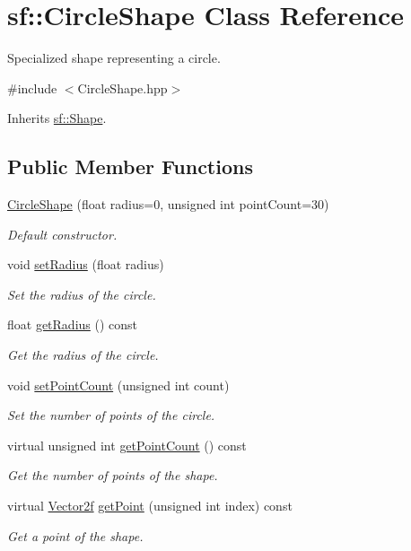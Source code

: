 \hypertarget{classsf_1_1_circle_shape}{\section{sf\+:\+:Circle\+Shape Class Reference}
\label{classsf_1_1_circle_shape}
}


Specialized shape representing a circle.  




{\ttfamily \#include $<$Circle\+Shape.\+hpp$>$}



Inherits \hyperlink{classsf_1_1_shape}{sf\+::\+Shape}.

\subsection*{Public Member Functions}
\begin{DoxyCompactItemize}
\item 
\hyperlink{classsf_1_1_circle_shape_a06a5e136da1cfa3bd2a945a5c7f718d3}{Circle\+Shape} (float radius=0, unsigned int point\+Count=30)
\begin{DoxyCompactList}\small\item\em Default constructor. \end{DoxyCompactList}\item 
void \hyperlink{classsf_1_1_circle_shape_a21cdf85fc2f201e10222a241af864be0}{set\+Radius} (float radius)
\begin{DoxyCompactList}\small\item\em Set the radius of the circle. \end{DoxyCompactList}\item 
float \hyperlink{classsf_1_1_circle_shape_afaf5175a75b6179cc177b1281027ab00}{get\+Radius} () const 
\begin{DoxyCompactList}\small\item\em Get the radius of the circle. \end{DoxyCompactList}\item 
void \hyperlink{classsf_1_1_circle_shape_a84249c4b23b20c24bf6891edde3cf744}{set\+Point\+Count} (unsigned int count)
\begin{DoxyCompactList}\small\item\em Set the number of points of the circle. \end{DoxyCompactList}\item 
virtual unsigned int \hyperlink{classsf_1_1_circle_shape_ae41ed830ca8f459e88ea6f125c240949}{get\+Point\+Count} () const 
\begin{DoxyCompactList}\small\item\em Get the number of points of the shape. \end{DoxyCompactList}\item 
virtual \hyperlink{classsf_1_1_vector2}{Vector2f} \hyperlink{classsf_1_1_circle_shape_a05139deaef220ed3d5a3bc4ca9aa9dbe}{get\+Point} (unsigned int index) const 
\begin{DoxyCompactList}\small\item\em Get a point of the shape. \end{DoxyCompactList}\end{DoxyCompactItemize}
